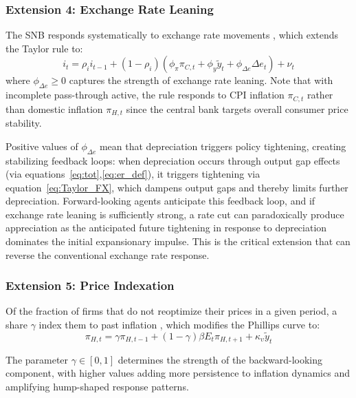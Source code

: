\documentclass[12pt,a4paper]{article}
\begin{document}
\subsubsection{Extension 4: Exchange Rate Leaning}

The SNB responds systematically to exchange rate movements \citep{cuchecurti2009}, which extends the Taylor rule to:
\begin{equation}
	\boxed{i_t = \rho_i i_{t-1} + (1-\rho_i)(\phi_\pi\pi_{C,t} + \phi_y\tilde{y}_t + \phi_{\Delta e}\Delta e_t) + \nu_t}
	\label{eq:Taylor_FX}
\end{equation}
where $\phi_{\Delta e} \geq 0$ captures the strength of exchange rate leaning. 
Note that with incomplete pass-through active, the rule responds to CPI inflation $\pi_{C,t}$ rather than domestic inflation $\pi_{H,t}$ since the central bank targets overall consumer price stability.

Positive values of $\phi_{\Delta e}$ mean that depreciation triggers policy 
tightening, creating stabilizing feedback loops: when depreciation occurs through output gap effects (via equations~\eqref{eq:tot},\eqref{eq:er_def}), it triggers tightening via equation~\eqref{eq:Taylor_FX}, which dampens output gaps and thereby limits further depreciation. Forward-looking agents anticipate this feedback loop, and if exchange rate leaning is sufficiently strong, a rate cut can paradoxically produce appreciation as the anticipated future tightening in response to depreciation dominates the initial expansionary impulse. This is the critical extension that can reverse the conventional exchange rate response.

\subsubsection{Extension 5: Price Indexation}

Of the fraction of firms that do not reoptimize their prices in a given period, a share $\gamma$ index them to past inflation \citep{gali2008}, which modifies the Phillips curve to:
\begin{equation}
	\boxed{\pi_{H,t} = \gamma\pi_{H,t-1} + (1-\gamma)\beta E_t\pi_{H,t+1} + \kappa_\upsilon\tilde{y}_t}
	\label{eq:NKPC_index}
\end{equation}

The parameter $\gamma \in [0,1]$ determines the strength of the backward-looking component, with higher values adding more persistence to inflation dynamics and amplifying hump-shaped response patterns.
\end{document}
